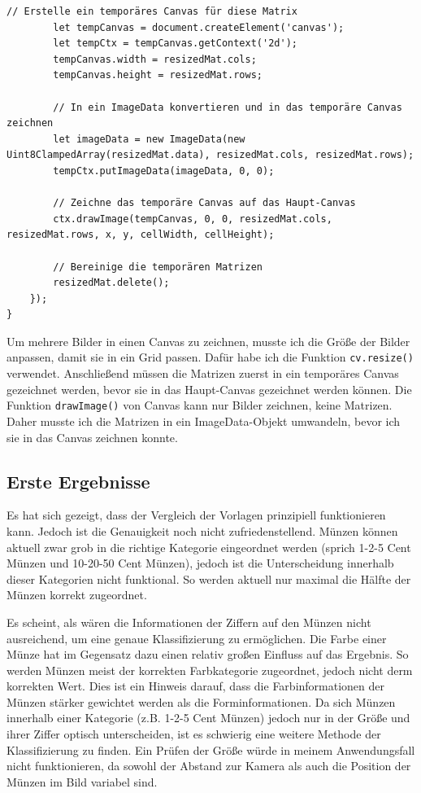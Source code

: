 \begin{lstlisting}[style=JavaScript]
        // Erstelle ein temporäres Canvas für diese Matrix
        let tempCanvas = document.createElement('canvas');
        let tempCtx = tempCanvas.getContext('2d');
        tempCanvas.width = resizedMat.cols;
        tempCanvas.height = resizedMat.rows;

        // In ein ImageData konvertieren und in das temporäre Canvas zeichnen
        let imageData = new ImageData(new Uint8ClampedArray(resizedMat.data), resizedMat.cols, resizedMat.rows);
        tempCtx.putImageData(imageData, 0, 0);

        // Zeichne das temporäre Canvas auf das Haupt-Canvas
        ctx.drawImage(tempCanvas, 0, 0, resizedMat.cols, resizedMat.rows, x, y, cellWidth, cellHeight);

        // Bereinige die temporären Matrizen
        resizedMat.delete();
    });
}
\end{lstlisting}

Um mehrere Bilder in einen Canvas zu zeichnen, musste ich die Größe der Bilder anpassen, damit sie in ein Grid passen. Dafür habe ich die Funktion \texttt{cv.resize()} verwendet. Anschließend müssen die Matrizen zuerst in ein temporäres Canvas gezeichnet werden, bevor sie in das Haupt-Canvas gezeichnet werden können. Die Funktion \texttt{drawImage()} von Canvas kann nur Bilder zeichnen, keine Matrizen. Daher musste ich die Matrizen in ein ImageData-Objekt umwandeln, bevor ich sie in das Canvas zeichnen konnte.
\subsection{Erste Ergebnisse}
Es hat sich gezeigt, dass der Vergleich der Vorlagen prinzipiell funktionieren kann. Jedoch ist die Genauigkeit  noch nicht zufriedenstellend. Münzen können aktuell zwar grob in die richtige Kategorie eingeordnet werden (sprich 1-2-5 Cent Münzen und 10-20-50 Cent Münzen), jedoch ist die Unterscheidung innerhalb dieser Kategorien nicht funktional. So werden aktuell nur maximal die Hälfte der Münzen korrekt zugeordnet.

Es scheint, als wären die Informationen der Ziffern auf den Münzen nicht ausreichend, um eine genaue Klassifizierung zu ermöglichen. Die Farbe einer Münze hat im Gegensatz dazu einen relativ großen Einfluss auf das Ergebnis. So werden Münzen meist der korrekten Farbkategorie zugeordnet, jedoch nicht derm korrekten Wert. Dies ist ein Hinweis darauf, dass die Farbinformationen der Münzen stärker gewichtet werden als die Forminformationen. Da sich Münzen innerhalb einer Kategorie (z.B. 1-2-5 Cent Münzen) jedoch nur in der Größe und ihrer Ziffer optisch unterscheiden, ist es schwierig eine weitere Methode der Klassifizierung zu finden. Ein Prüfen der Größe würde in meinem Anwendungsfall nicht funktionieren, da sowohl der Abstand zur Kamera als auch die Position der Münzen im Bild variabel sind. 

